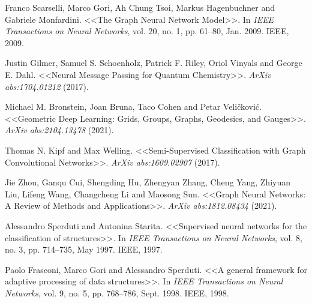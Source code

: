 \begin{thebibliography}{1}
 Franco Scarselli, Marco Gori, Ah Chung Tsoi, Markus Hagenbuchner and Gabriele Monfardini. <<The Graph Neural Network Model>>. In \textit{IEEE Transactions on Neural Networks}, vol. 20, no. 1, pp. 61--80, Jan. 2009. IEEE, 2009.

 Justin Gilmer, Samuel S. Schoenholz, Patrick F. Riley, Oriol Vinyals and George E. Dahl. <<Neural Message Passing for Quantum Chemistry>>. \textit{ArXiv abs:1704.01212} (2017).

 Michael M. Bronstein, Joan Bruna, Taco Cohen and Petar Veli\v{c}kovi\'{c}. <<Geometric Deep Learning: Grids, Groups, Graphs, Geodesics, and Gauges>>. \textit{ArXiv abs:2104.13478} (2021).

 Thomas N. Kipf and Max Welling. <<Semi-Supervised Classification with Graph Convolutional Networks>>. \textit{ArXiv abs:1609.02907} (2017).

 Jie Zhou, Ganqu Cui, Shengding Hu, Zhengyan Zhang, Cheng Yang, Zhiyuan Liu, Lifeng Wang, Changcheng Li and Maosong Sun. <<Graph Neural Networks: A Review of Methods and Applications>>. \textit{ArXiv abs:1812.08434} (2021).

 Alessandro Sperduti and Antonina Starita. <<Supervised neural networks for the classification of structures>>. In \textit{IEEE Transactions on Neural Networks}, vol. 8, no. 3, pp. 714--735, May 1997. IEEE, 1997.

 Paolo Frasconi, Marco Gori and Alessandro Sperduti. <<A general framework for adaptive processing of data structures>>. In \textit{IEEE Transactions on Neural Networks}, vol. 9, no. 5, pp. 768--786, Sept. 1998. IEEE, 1998.



\end{thebibliography}
